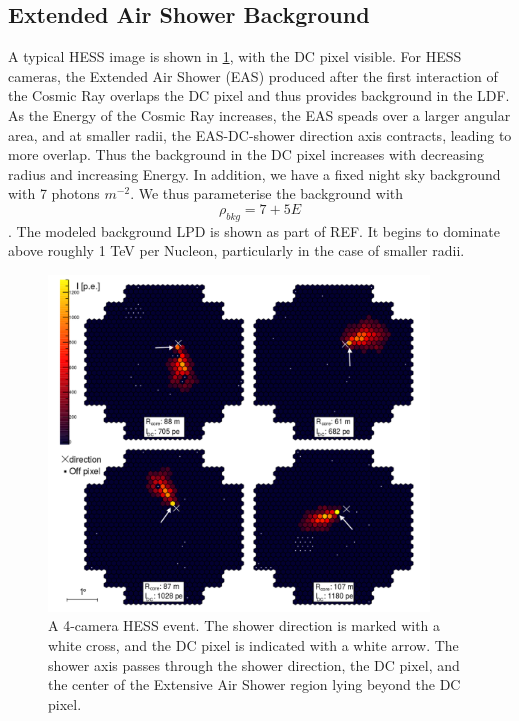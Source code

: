\documentclass{article}
\begin{document}
\subsection{Extended Air Shower Background}
A typical HESS image is shown in \ref{fig:hess}, with the DC pixel visible. For HESS cameras, the Extended Air Shower (EAS) produced after the first interaction of the Cosmic Ray overlaps the DC pixel and thus provides background in the LDF. As the Energy of the Cosmic Ray increases, the EAS speads over a larger angular area, and at smaller radii, the EAS-DC-shower direction axis contracts, leading to more overlap. Thus the background in the DC pixel increases with decreasing radius and increasing Energy. In addition, we have a fixed night sky background with 7 photons $m^{-2}$. We thus parameterise the background with \[ \rho_{bkg}  = 7 + 5E\]. The modeled background LPD is shown as part of REF. It begins to dominate above roughly 1 TeV per Nucleon, particularly in the case of smaller radii. 

\begin{figure}
\begin{center}
\includegraphics[width=0.9\textwidth]{hess}
\caption{A 4-camera HESS event. The shower direction is marked with a white cross, and the DC pixel is indicated with a white arrow. The shower axis passes through the shower direction, the DC pixel, and the center of the Extensive Air Shower region lying beyond the DC pixel.}
\label{fig:hess}
\end{center}
\end{figure}
\end{document}

